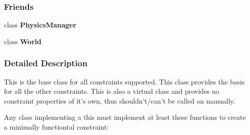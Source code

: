 \subsubsection*{Friends}
\begin{DoxyCompactItemize}
\item 
\hypertarget{classphys_1_1TypedConstraint_a139cf05ac01161b7071c8a037c841683}{
class {\bfseries PhysicsManager}}
\label{classphys_1_1TypedConstraint_a139cf05ac01161b7071c8a037c841683}

\item 
\hypertarget{classphys_1_1TypedConstraint_a7b4bcdf992c21ae83363f25df05b1d25}{
class {\bfseries World}}
\label{classphys_1_1TypedConstraint_a7b4bcdf992c21ae83363f25df05b1d25}

\end{DoxyCompactItemize}


\subsubsection{Detailed Description}
This is the base class for all constraints supported. This class provides the basis for all the other constraints. This is also a virtual class and provides no constraint properties of it's own, thus shouldn't/can't be called on manually. \par
 \par
 Any class implementing a this must implement at least these functions to create a minimally functiontal constraint: \par

